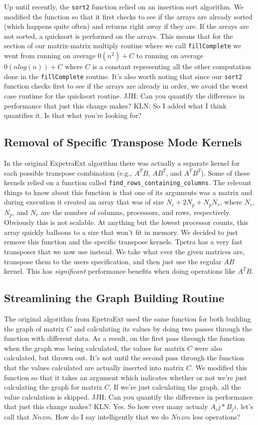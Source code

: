 \documentclass{article}
\newcommand{\JJH}[1]{\textcolor{jhuGreen}{JJH: #1}}
\newcommand{\KLN}[1]{\textcolor{klnBlue}{KLN: #1}}
\begin{document}
Up until recently, the \verb!sort2! function relied on an insertion sort algorithm. We modified the function so that it first 
checks to see if the arrays are already sorted (which happens quite often) and returns right away if they are. 
If the arrays are not sorted, a quicksort is performed on the arrays. This means that for the section of our matrix-matrix
multiply routine where we call \verb!fillComplete! we went from running on average $0(n^2)+C$ to running on average
$0(nlog(n))+C$ where $C$ is a constant representing all the other computation done in the \verb!fillComplete! routine.
It's also worth noting that since our \verb!sort2! function checks first to see if the arrays are already in order, we avoid
the worst case runtime for the quicksort routine.
\JJH{Can you quantify the difference in performance that just this change makes?}
\KLN{So I added what I think quantifies it. Is that what you're looking for?}

\subsection{Removal of Specific Transpose Mode Kernels}
In the original ExpetraExt algorithm there was actually a separate kernel for each possible transpose combination 
(e.g., $A^TB$, $AB^T$, and $A^TB^T$).
Some of these kernels relied on a function called \verb!find_rows_containing_columns!. The relevant things to know about this 
function is that one of its arguments was a matrix and during execution it created an array that was of size 
$N_c+ 2N_p + N_p N_r$, where
$N_c$, $N_p$, and $N_r$ are the number of columns, processors, and rows, respectively.
Obviously this is not scalable. At anything but the lowest processor counts, this array quickly balloons to a size that 
won't fit in memory. We decided to just remove this function and the specific transpose kernels. Tpetra has a very fast 
transposer that we now use instead. We take what ever the given matrices are, transpose them to the users specification, 
and then just use the regular $AB$ kernel. This has \emph{significant} performance benefits when doing operations like 
$A^TB$.


\subsection{Streamlining the Graph Building Routine}
The original algorithm from EpetraExt used the same function for both building the graph of matrix $C$ and calculating its 
values by doing two passes through the function with different data. 
As a result, on the first pass through the function when the graph was being calculated, the values for matrix $C$ were also 
calculated, but thrown out. It's not until the second pass through the function 
that the values calculated are actually inserted into matrix $C$. We modified this function so that it
takes an argument which indicates whether or not we're just calculating the graph for matrix $C$. If we're just calculating 
the graph, all the value calculation is skipped.
\JJH{Can you quantify the difference in performance that just this change makes?}
\KLN{Yes. So how ever many actualy $A_ij*B_ji$, let's call that $Nnzm$. How do I say intelligently that we do
$Nnzm$ less operations?}
\end{document}
